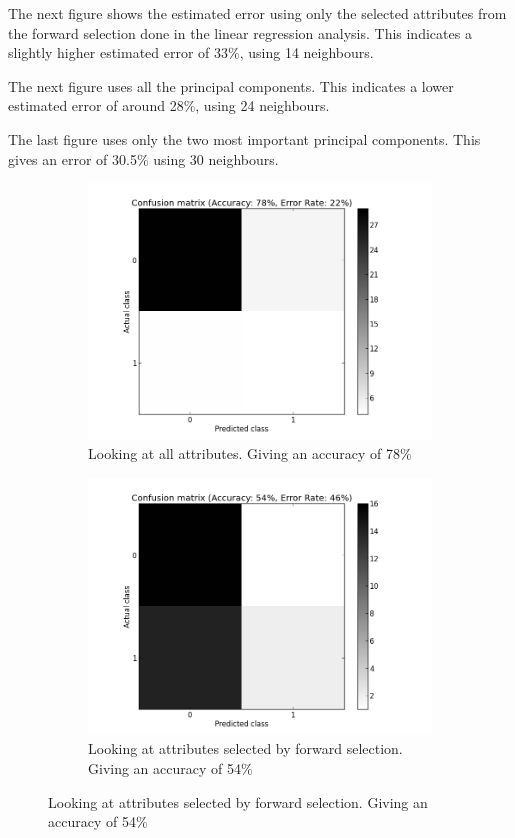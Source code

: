 The next figure shows the estimated error using only the selected attributes from the forward selection done in the linear regression analysis. This indicates a slightly higher estimated error of 33\%, using 14 neighbours.

The next figure uses all the principal components. This indicates a lower estimated error of around 28\%, using 24 neighbours.

The last figure uses only the two most important principal components. This gives an error of 30.5\% using 30 neighbours.

\begin{figure}[H]
	\begin{subfigure}[b]{0.5\textwidth}
	\includegraphics[scale=0.2]{pictures/cmX.png}
	\caption{Looking at all attributes. \newline Giving an accuracy of 78\% }
	\label{cmResultX}
	\end{subfigure}
	\begin{subfigure}[b]{0.5\textwidth}
	\includegraphics[scale=0.2]{pictures/cmXAD.png}	
	\caption{Looking at attributes selected by forward selection.  Giving an accuracy of 54\%}
	\label{cmResultXad}
	\end{subfigure}


\end{figure}
